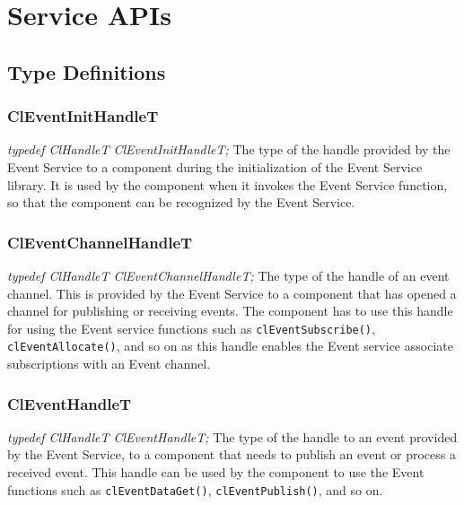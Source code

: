 \begin{flushleft}
\begin{itemize}
\end{itemize}


\chapter{Service APIs}


\section{Type Definitions}

\subsection{ClEventInitHandleT}
\textit{typedef ClHandleT ClEventInitHandleT;}          
\newline
\newline
The type of the handle provided by the Event Service to a component during the initialization of the Event Service library. It is used by the 
component when it invokes the Event Service function, so that the component can be recognized by the Event Service.

\subsection{ClEventChannelHandleT}
\textit{typedef ClHandleT ClEventChannelHandleT;}
\newline
\newline
The type of the handle of an event channel. This is provided by the Event Service to a component that has opened a channel for publishing or receiving events. 
The component has to use this handle for using the Event service functions such as {\tt{clEventSubscribe()}}, {\tt{clEventAllocate()}}, and so on as this
handle enables the Event service associate subscriptions with an Event channel. 

\subsection{ClEventHandleT}
\textit{typedef ClHandleT ClEventHandleT;}
\newline
\newline
The type of the handle to an event provided by the Event Service, to a component that needs to publish an event or process a received event. This
handle can be used by the component to use the Event functions such as {\tt{clEventDataGet()}}, {\tt{clEventPublish()}}, and so on.



\end{flushleft}
